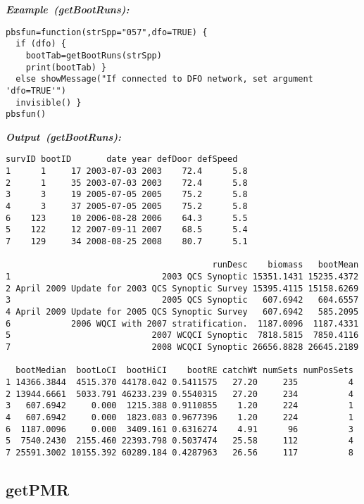 \documentclass[letterpaper,12pt,fleqn]{article}
\newcommand\example[1]{    %
	\textbf{\emph{Example~(#1):}}\\ \vspace{3 pt}
}
\newcommand\results[1]{    %
	\textbf{\emph{Output~(#1):}}\\ \vspace{3 pt}
}
\begin{document}
\begin{examplebox}
\example{getBootRuns}
\begin{Verbatim}[fontsize=\footnotesize]
pbsfun=function(strSpp="057",dfo=TRUE) {
  if (dfo) {
    bootTab=getBootRuns(strSpp)
    print(bootTab) }
  else showMessage("If connected to DFO network, set argument 'dfo=TRUE'")
  invisible() }
pbsfun()
\end{Verbatim}
\end{examplebox}

\begin{outputbox}
\results{getBootRuns}
\begin{Verbatim}[fontsize=\footnotesize]
  survID bootID       date year defDoor defSpeed
1      1     17 2003-07-03 2003    72.4      5.8
2      1     35 2003-07-03 2003    72.4      5.8
3      3     19 2005-07-05 2005    75.2      5.8
4      3     37 2005-07-05 2005    75.2      5.8
6    123     10 2006-08-28 2006    64.3      5.5
5    122     12 2007-09-11 2007    68.5      5.4
7    129     34 2008-08-25 2008    80.7      5.1

                                         runDesc    biomass   bootMean
1                              2003 QCS Synoptic 15351.1431 15235.4372
2 April 2009 Update for 2003 QCS Synoptic Survey 15395.4115 15158.6269
3                              2005 QCS Synoptic   607.6942   604.6557
4 April 2009 Update for 2005 QCS Synoptic Survey   607.6942   585.2095
6            2006 WQCI with 2007 stratification.  1187.0096  1187.4331
5                            2007 WCQCI Synoptic  7818.5815  7850.4116
7                            2008 WCQCI Synoptic 26656.8828 26645.2189

  bootMedian  bootLoCI  bootHiCI    bootRE catchWt numSets numPosSets
1 14366.3844  4515.370 44178.042 0.5411575   27.20     235          4
2 13944.6661  5033.791 46233.239 0.5540315   27.20     234          4
3   607.6942     0.000  1215.388 0.9110855    1.20     224          1
4   607.6942     0.000  1823.083 0.9677396    1.20     224          1
6  1187.0096     0.000  3409.161 0.6316274    4.91      96          3
5  7540.2430  2155.460 22393.798 0.5037474   25.58     112          4
7 25591.3002 10155.392 60289.184 0.4287963   26.56     117          8
\end{Verbatim}
\end{outputbox}

\subsection {getPMR}
\end{document}
